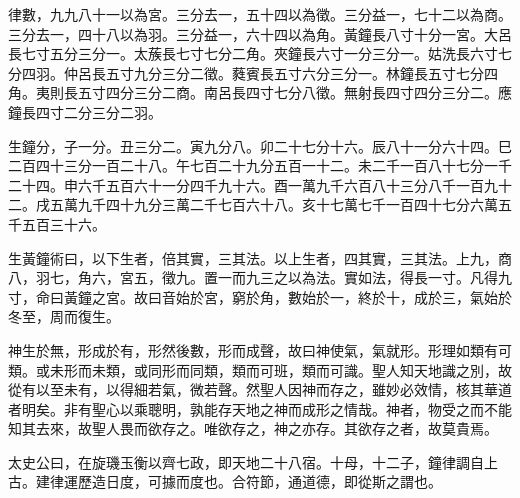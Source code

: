 律數，九九八十一以為宮。三分去一，五十四以為徵。三分益一，七十二以為商。三分去一，四十八以為羽。三分益一，六十四以為角。黃鐘長八寸十分一宮。大呂長七寸五分三分一。太蔟長七寸七分二角。夾鐘長六寸一分三分一。姑洗長六寸七分四羽。仲呂長五寸九分三分二徵。蕤賓長五寸六分三分一。林鐘長五寸七分四角。夷則長五寸四分三分二商。南呂長四寸七分八徵。無射長四寸四分三分二。應鐘長四寸二分三分二羽。

生鐘分，子一分。丑三分二。寅九分八。卯二十七分十六。辰八十一分六十四。巳二百四十三分一百二十八。午七百二十九分五百一十二。未二千一百八十七分一千二十四。申六千五百六十一分四千九十六。酉一萬九千六百八十三分八千一百九十二。戌五萬九千四十九分三萬二千七百六十八。亥十七萬七千一百四十七分六萬五千五百三十六。

生黃鐘術曰，以下生者，倍其實，三其法。以上生者，四其實，三其法。上九，商八，羽七，角六，宮五，徵九。置一而九三之以為法。實如法，得長一寸。凡得九寸，命曰黃鐘之宮。故曰音始於宮，窮於角，數始於一，終於十，成於三，氣始於冬至，周而復生。

神生於無，形成於有，形然後數，形而成聲，故曰神使氣，氣就形。形理如類有可類。或未形而未類，或同形而同類，類而可班，類而可識。聖人知天地識之別，故從有以至未有，以得細若氣，微若聲。然聖人因神而存之，雖妙必效情，核其華道者明矣。非有聖心以乘聰明，孰能存天地之神而成形之情哉。神者，物受之而不能知其去來，故聖人畏而欲存之。唯欲存之，神之亦存。其欲存之者，故莫貴焉。

太史公曰，在旋璣玉衡以齊七政，即天地二十八宿。十母，十二子，鐘律調自上古。建律運歷造日度，可據而度也。合符節，通道德，即從斯之謂也。